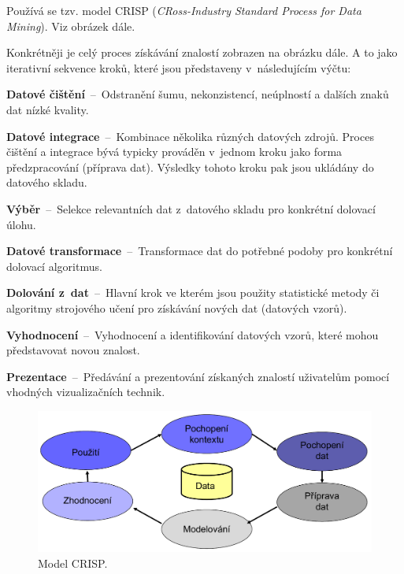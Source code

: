 \begin{compactitem}
    \item Používá se tzv. model CRISP (\textit{CRoss-Industry Standard Process for Data Mining}). Viz obrázek dále.

    \item Konkrétněji je celý proces získávání znalostí zobrazen na obrázku dále. A to jako iterativní sekvence kroků, které jsou představeny v~následujícím výčtu: \begin{compactenum}
        \item \textbf{Datové čištění}~--~Odstranění šumu, nekonzistencí, neúplností a dalších znaků dat nízké kvality.

        \item \textbf{Datové integrace}~--~Kombinace několika různých datových zdrojů. Proces čištění a integrace bývá typicky prováděn v~jednom kroku jako forma předzpracování (příprava dat). Výsledky tohoto kroku pak jsou ukládány do datového skladu.

        \item \textbf{Výběr}~--~Selekce relevantních dat z~datového skladu pro konkrétní dolovací úlohu.

        \item \textbf{Datové transformace}~--~Transformace dat do potřebné podoby pro konkrétní dolovací algoritmus.

        \item \textbf{Dolování z~dat}~--~Hlavní krok ve kterém jsou použity statistické metody či algoritmy strojového učení pro získávání nových dat (datových vzorů).

        \item \textbf{Vyhodnocení}~--~Vyhodnocení a identifikování datových vzorů, které mohou představovat novou znalost.

        \item \textbf{Prezentace}~--~Předávání a prezentování získaných znalostí uživatelům pomocí vhodných vizualizačních technik.
    \end{compactenum}
\end{compactitem}

\begin{figure}[H]
    \centering
    \includegraphics[width=0.75\linewidth]{crisp.pdf}
    \caption{Model CRISP.}
\end{figure}

